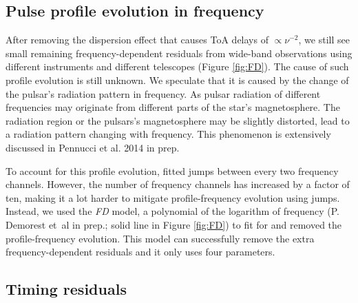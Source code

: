 \subsection{Pulse profile evolution in frequency}
\label{sec:FD}
After removing the dispersion effect that causes ToA delays of $\propto \nu^{-2}$,
 we still see small remaining frequency-dependent residuals from wide-band
observations using
different instruments and different telescopes (Figure \ref{fig:FD}).  
The cause of such profile evolution is still unknown.
We speculate that it is caused by the change of the pulsar's radiation pattern in frequency. As pulsar radiation of different frequencies may originate from
different parts of the star's magnetosphere. 
The radiation region or the pulsars's magnetosphere may be slightly distorted,
lead to a radiation pattern changing with frequency. This phenomenon is extensively discussed in Pennucci et al. 2014 in prep.

To account for this profile evolution, \citet{sns+05} fitted jumps between every two frequency channels. However, the number of frequency channels has increased by a factor of ten, making it a lot harder to mitigate profile-frequency evolution using jumps. 
Instead, we used the {\it FD} model, a polynomial of the logarithm of
frequency (P. Demorest et~al in prep.; solid line in Figure \ref{fig:FD}) to fit for and removed the profile-frequency evolution. This model can successfully remove the extra frequency-dependent residuals and it only uses four parameters.



\subsection{Timing residuals}
\label{sec:res}

